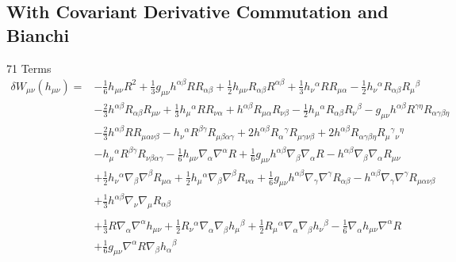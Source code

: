 \documentclass[10pt,letterpaper]{article}
\begin{document}
\subsection*{With Covariant Derivative Commutation and Bianchi}
71 Terms
\begin{align}
\delta W_{\mu\nu}(h_{\mu\nu})={}&- \tfrac{1}{6} h_{\mu \nu} R^2
 + \tfrac{1}{3} g_{\mu \nu} h^{\alpha \beta} R R_{\alpha \beta}
 + \tfrac{1}{2} h_{\mu \nu} R_{\alpha \beta} R^{\alpha \beta}
 + \tfrac{1}{3} h_{\nu}{}^{\alpha} R R_{\mu \alpha}
 -  \tfrac{1}{2} h_{\nu}{}^{\alpha} R_{\alpha \beta} R_{\mu}{}^{\beta}\nonumber\\
& -  \tfrac{2}{3} h^{\alpha \beta} R_{\alpha \beta} R_{\mu \nu}
 + \tfrac{1}{3} h_{\mu}{}^{\alpha} R R_{\nu \alpha}
 + h^{\alpha \beta} R_{\mu \alpha} R_{\nu \beta}
 -  \tfrac{1}{2} h_{\mu}{}^{\alpha} R_{\alpha \beta} R_{\nu}{}^{\beta}
 -  g_{\mu \nu} h^{\alpha \beta} R^{\gamma \eta} R_{\alpha \gamma \beta \eta}\nonumber\\
& -  \tfrac{2}{3} h^{\alpha \beta} R R_{\mu \alpha \nu \beta}
 -  h_{\nu}{}^{\alpha} R^{\beta \gamma} R_{\mu \beta \alpha \gamma}
 + 2 h^{\alpha \beta} R_{\alpha}{}^{\gamma} R_{\mu \gamma \nu \beta}
 + 2 h^{\alpha \beta} R_{\alpha \gamma \beta \eta} R_{\mu}{}^{\gamma}{}_{\nu}{}^{\eta}\nonumber\\
& -  h_{\mu}{}^{\alpha} R^{\beta \gamma} R_{\nu \beta \alpha \gamma}
 -  \tfrac{1}{6} h_{\mu \nu} \nabla_{\alpha}\nabla^{\alpha}R
 + \tfrac{1}{6} g_{\mu \nu} h^{\alpha \beta} \nabla_{\beta}\nabla_{\alpha}R
 -  h^{\alpha \beta} \nabla_{\beta}\nabla_{\alpha}R_{\mu \nu}\nonumber\\
& + \tfrac{1}{2} h_{\nu}{}^{\alpha} \nabla_{\beta}\nabla^{\beta}R_{\mu \alpha}
 + \tfrac{1}{2} h_{\mu}{}^{\alpha} \nabla_{\beta}\nabla^{\beta}R_{\nu \alpha}
 + \tfrac{1}{6} g_{\mu \nu} h^{\alpha \beta} \nabla_{\gamma}\nabla^{\gamma}R_{\alpha \beta}
 -  h^{\alpha \beta} \nabla_{\gamma}\nabla^{\gamma}R_{\mu \alpha \nu \beta}\nonumber\\
& + \tfrac{1}{3} h^{\alpha \beta} \nabla_{\nu}\nabla_{\mu}R_{\alpha \beta}\nonumber \\ \nonumber
\\
&+\tfrac{1}{3} R \nabla_{\alpha}\nabla^{\alpha}h_{\mu \nu}
 + \tfrac{1}{2} R_{\nu}{}^{\alpha} \nabla_{\alpha}\nabla_{\beta}h_{\mu}{}^{\beta}
 + \tfrac{1}{2} R_{\mu}{}^{\alpha} \nabla_{\alpha}\nabla_{\beta}h_{\nu}{}^{\beta}
 -  \tfrac{1}{6} \nabla_{\alpha}h_{\mu \nu} \nabla^{\alpha}R\nonumber\\
& + \tfrac{1}{6} g_{\mu \nu} \nabla^{\alpha}R \nabla_{\beta}h_{\alpha}{}^{\beta}

\end{align}
\end{document}
